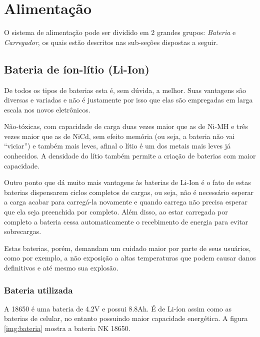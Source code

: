 
\section{Alimentação} %
\label{sec:alimentação}
	
	O sistema de alimentação pode ser dividido em 2 grandes grupos: \textit{Bateria} e \textit{Carregador}, os quais estão descritos nas sub-seções dispostas a seguir.

	\subsection{Bateria de íon-lítio (Li-Ion)} %
	\label{sub:bateria}
		
		De todos os tipos de baterias esta é, sem dúvida, a melhor. Suas vantagens são diversas e variadas e não é justamente por isso que elas são empregadas em larga escala nos novos eletrônicos.

		Não-tóxicas, com capacidade de carga duas vezes maior que as de Ni-MH e três vezes maior que as de NiCd, sem efeito memória (ou seja, a bateria não vai “viciar”) e também mais leves, afinal o lítio é um dos metais mais leves já conhecidos. A densidade do lítio também permite a criação de baterias com maior capacidade.

		Outro ponto que dá muito mais vantagens às baterias de Li-Ion é o fato de estas baterias dispensarem ciclos completos de cargas, ou seja, não é necessário esperar a carga acabar para carregá-la novamente e quando carrega não precisa esperar que ela seja preenchida por completo. Além disso, ao estar carregada por completo a bateria cessa automaticamente o recebimento de energia para evitar sobrecargas.

		Estas baterias, porém, demandam um cuidado maior por parte de seus usuários, como por exemplo, a não exposição a altas temperaturas que podem causar danos definitivos e até mesmo sua explosão.

	\subsubsection{Bateria utilizada}

		A 18650 é uma bateria de 4.2V e possui 8.8Ah. É de Li-íon assim como as baterias de celular, no entanto possuindo maior capacidade energética. A figura \ref{img:bateria} mostra a bateria NK 18650.

